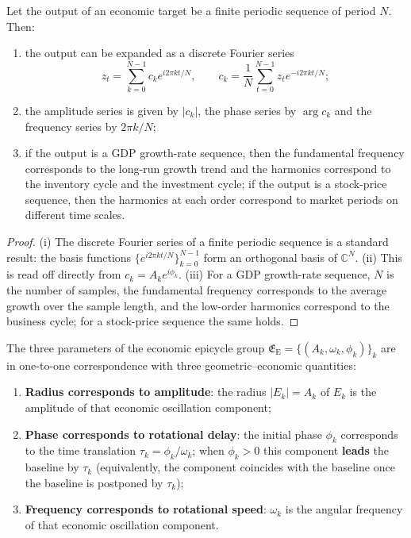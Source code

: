 \begin{theorem}\label{thm:econ_series_reconstruction}
Let the output of an economic target be a finite periodic sequence of period $N$. Then:
\begin{enumerate}[label=(\roman*)]
    \item the output can be expanded as a discrete Fourier series
    \[
    z_t=\sum_{k=0}^{N-1}c_k e^{i2\pi kt/N},\qquad
    c_k=\frac1N\sum_{t=0}^{N-1}z_t e^{-i2\pi kt/N};
    \]
    \item the amplitude series is given by $|c_k|$, the phase series by $\arg c_k$ and the frequency series by $2\pi k/N$;
    \item if the output is a GDP growth-rate sequence, then the fundamental frequency corresponds to the long-run growth trend and the harmonics correspond to the inventory cycle and the investment cycle; if the output is a stock-price sequence, then the harmonics at each order correspond to market periods on different time scales.
\end{enumerate}
\end{theorem}

\begin{proof}
(i) The discrete Fourier series of a finite periodic sequence is a standard result: the basis functions $\{e^{i2\pi kt/N}\}_{k=0}^{N-1}$ form an orthogonal basis of $\mathbb C^N$.
(ii) This is read off directly from $c_k=A_k e^{i\phi_k}$.
(iii) For a GDP growth-rate sequence, $N$ is the number of samples, the fundamental frequency corresponds to the average growth over the sample length, and the low-order harmonics correspond to the business cycle; for a stock-price sequence the same holds.
\end{proof}

\begin{proposition}\label{prop:econ_epicycle_correspondence}
The three parameters of the economic epicycle group $\mathfrak E_{\mathrm{E}}=\{(A_k,\omega_k,\phi_k)\}_{k}$ are in one-to-one correspondence with three geometric--economic quantities:
\begin{enumerate}[label=(\roman*)]
    \item \textbf{Radius corresponds to amplitude}: the radius $|E_k|=A_k$ of $E_k$ is the amplitude of that economic oscillation component;
    \item \textbf{Phase corresponds to rotational delay}: the initial phase $\phi_k$ corresponds to the time translation $\tau_k=\phi_k/\omega_k$; when $\phi_k>0$ this component \textbf{leads} the baseline by $\tau_k$ (equivalently, the component coincides with the baseline once the baseline is postponed by $\tau_k$);
    \item \textbf{Frequency corresponds to rotational speed}: $\omega_k$ is the angular frequency of that economic oscillation component.
\end{enumerate}
\end{proposition}

